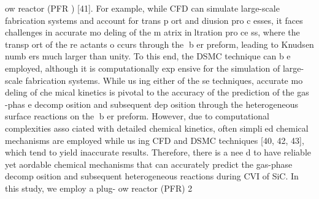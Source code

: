 \documentclass[10pt, letterpaper]{article}
\begin{document}
ow reactor (PFR ) [41]. For example, while
CFD can simulate large-scale fabrication systems and account for trans p ort and diusion pro c esses, it faces
challenges in accurate mo deling of the m atrix inltration pro ce ss, where the transp ort of the re actants
o ccurs through the b er preform, leading to Knudsen numb ers much larger than unity. To this end, the
DSMC technique can b e employed, although it is computationally exp ensive for the simulation of large-scale
fabrication systems. While us ing either of the se techniques, accurate mo deling of che mical kinetics is pivotal
to the accuracy of the prediction of the gas -phas e decomp osition and subsequent dep osition through the
heterogeneous surface reactions on the b er preform. However, due to computational complexities asso ciated
with detailed chemical kinetics, often simplied chemical mechanisms are employed while us ing CFD and
DSMC techniques [40, 42, 43], which tend to yield inaccurate results. Therefore, there is a nee d to have
reliable yet aordable chemical mechanisms that can accurately predict the gas-phase decomp osition and
subsequent heterogeneous reactions during CVI of SiC. In this study, we employ a plug-
ow reactor (PFR)
2
\end{document}
